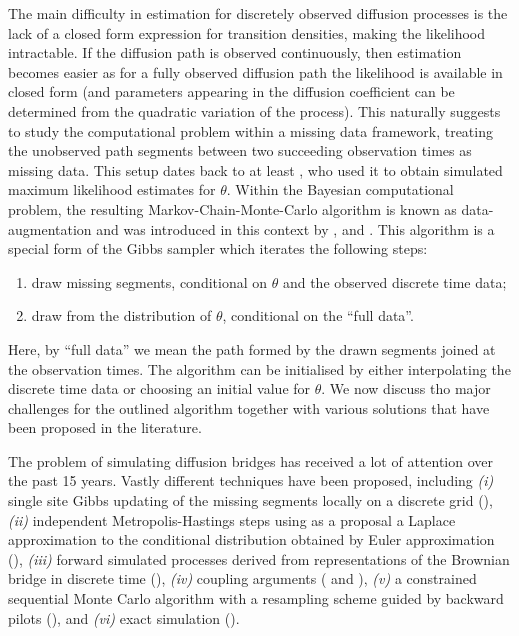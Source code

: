 \documentclass[preprint]{imsart}
\renewcommand{\th}{\theta}
\theoremstyle{definition}
\begin{document}
The main difficulty in estimation for discretely observed diffusion processes is the lack of a closed form expression for  transition densities, making  the  likelihood intractable. If the diffusion path is observed continuously, then estimation becomes easier as for a fully observed diffusion path the likelihood is available in closed form (and parameters appearing in the diffusion coefficient can be determined from the quadratic variation of the process).   This naturally suggests to study the computational problem within a missing data framework, treating the unobserved path segments between two succeeding observation times as missing data. This setup dates back to at least \cite{Pedersen}, who used it to obtain simulated maximum likelihood estimates for $\th$. Within the Bayesian computational problem,   the resulting Markov-Chain-Monte-Carlo algorithm is known as data-augmentation and was introduced in this context by \cite{Eraker}, \cite{ElerianChibShephard} and \cite{RobertsStramer}.  
This algorithm is a special form of the  Gibbs sampler  which iterates the following steps:
\begin{enumerate}
\item draw missing segments, conditional on $\th$ and the observed discrete time data;
\item draw from the distribution of $\th$, conditional on the ``full data''.
\end{enumerate}
Here, by ``full data'' we mean the path formed by the drawn segments joined at the observation times. 
The algorithm can be initialised by either interpolating the discrete time data or choosing an initial value for $\th$.  We now discuss tho major challenges for the outlined algorithm together with various solutions that have been proposed in the literature. 

\medskip

The problem of simulating diffusion bridges  has received a lot of attention  over the past 15 years. Vastly different techniques have been proposed, 
 including {\it (i)} single site Gibbs updating of the missing segments locally on a discrete grid (\cite{Eraker}), {\it (ii)}  independent Metropolis-Hastings steps using as a proposal a Laplace approximation to the conditional distribution obtained by Euler approximation (\cite{ElerianChibShephard}),  {\it (iii)} forward simulated processes derived from representations of the Brownian bridge in discrete time (\cite{DurhamGallant}), {\it (iv)}  coupling arguments (\cite{Bladt} and \cite{Bladt2}), {\it (v)}  a constrained sequential Monte Carlo algorithm with a resampling scheme guided by
backward pilots (\cite{LinChenMykland}),  and {\it (vi)}  exact simulation (\cite{BeskosPapaspiliopoulosRobertsFearnhead}). 
\end{document}
